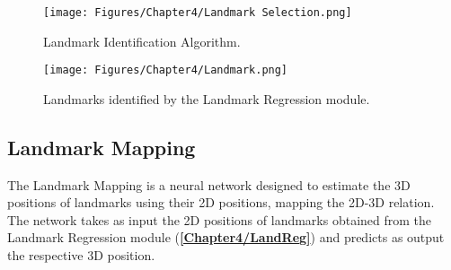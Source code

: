 \begin{figure}[H]
    \centering
    \texttt{[image: Figures/Chapter4/Landmark Selection.png]}
    \caption[Landmark Identification Algorithm.]{Landmark Identification Algorithm.}
    \label{fig:Landmark Identification Algorithm}
\end{figure}

\begin{figure}[H]
    \centering
    \texttt{[image: Figures/Chapter4/Landmark.png]}
    \caption[Landmarks identified by the Landmark Regression module.]{Landmarks identified by the Landmark Regression module.}
    \label{fig:Identified landmarks}
\end{figure}



\newpage
\subsection{Landmark Mapping}
The Landmark Mapping is a neural network designed to estimate the 3D positions of landmarks using their 2D positions, mapping the 2D-3D relation.\\
The network takes as input the 2D positions of landmarks obtained from the Landmark Regression module (\textbf{\ref{Chapter4/LandReg}}) and predicts as output the respective 3D position.

